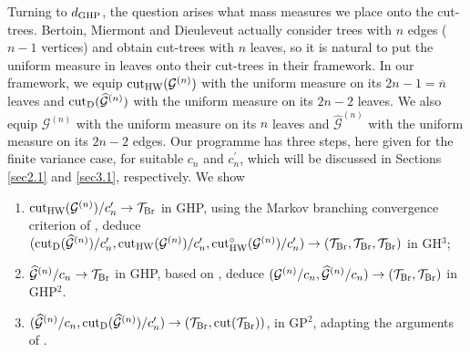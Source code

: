 \documentclass[11pt,a4paper]{article}
\newtheorem{cor}[prop]{Corollary}
\newcommand{\cG}{\mathcal{G}}
\newcommand{\cT}{\mathcal{T}}
\newcommand{\modcut}{{\rm cut}_{\rm HW}}
\newcommand{\ourcut}{{\rm cut}_{\rm HW}^\circ}
\begin{document}
Turning to $d_{\rm GHP}$, the question arises what mass measures we place onto the cut-trees. Bertoin, Miermont and Dieuleveut actually consider trees with $n$ edges ($n-1$ vertices) and obtain cut-trees with $n$ leaves, so it is natural to put the uniform measure in leaves onto their cut-trees in their framework.
In our framework, we equip $\modcut(\cG^{(n)})$ with the uniform measure on its $2n-1=\overline{n}$ leaves and ${\rm cut}_{\rm D}(\widehat{\cG}^{(n)})$ with the
uniform measure on its $2n-2$ leaves. We also equip $\cG^{(n)}$ with the uniform measure on its $n$ leaves and $\widehat{\cG}^{(n)}$ with the uniform
measure on its $2n-2$ edges. Our programme has three steps, here given for the finite variance case, for suitable $c_n$ and $c_n^\prime$, which will be discussed in Sections 
\ref{sec2.1} and \ref{sec3.1}, respectively. We show%
\begin{enumerate}
  \item $\modcut(\cG^{(n)})/c_n^\prime\rightarrow\cT_{\rm Br}$ in GHP, using the Markov branching convergence criterion of \cite{HM10}, deduce $({\rm cut}_{\rm D}(\widehat{\cG}^{(n)})/c_n^\prime,\modcut(\cG^{(n)})/c_n^\prime,\ourcut(\cG^{(n)})/c_n^\prime)\rightarrow(\cT_{\rm Br},\cT_{\rm Br},\cT_{\rm Br})$ in GH$^3$;
  \item $\widehat{\cG}^{(n)}/c_n\rightarrow\cT_{\rm Br}$ in GHP, based on \cite{Mie08,deR15}, deduce $(\cG^{(n)}/c_n,\widehat{\cG}^{(n)}/c_n)\rightarrow(\cT_{\rm Br},\cT_{\rm Br})$ in GHP$^2$.
  \item $(\widehat{\cG}^{(n)}/c_n,{\rm cut}_{\rm D}(\widehat{\cG}^{(n)})/c_n^\prime)\rightarrow (\cT_{\rm Br},{\rm cut}(\cT_{\rm Br}))$, in GP$^2$, adapting the arguments of \cite{Die13}.
\end{enumerate}
\end{document}
